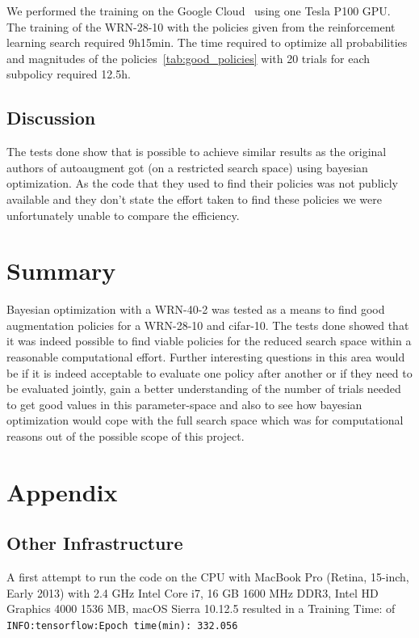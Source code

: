 \documentclass[10pt,twocolumn,letterpaper]{article}
\begin{document}
We performed the training on the Google Cloud~\cite{GCloud} using one Tesla P100 GPU. The training of the WRN-28-10 with the policies given from the reinforcement learning search required 9h15min. The time required to optimize all probabilities and magnitudes of the policies~\ref{tab:good_policies} with 20 trials for each subpolicy required 12.5h. \newline

\subsection{Discussion}

The tests done show that is possible to achieve similar results as the original authors of autoaugment got (on a restricted search space) using bayesian optimization. As the code that they used to find their policies was not publicly available and they don't state the effort taken to find these policies we were unfortunately unable to compare the efficiency. 

\section{Summary}

Bayesian optimization with a WRN-40-2 was tested as a means to find good augmentation policies for a WRN-28-10 and cifar-10. The tests done showed that it was indeed possible to find viable policies for the reduced search space within a reasonable computational effort. Further interesting questions in this area would be if it is indeed acceptable to evaluate one policy after another or if they need to be evaluated jointly, gain a better understanding of the number of trials needed to get good values in this parameter-space and also to see how bayesian optimization would cope with the full search space which was for computational reasons out of the possible scope of this project.


\section{Appendix}

\subsection{Other Infrastructure}
A first attempt to run the code on the CPU with MacBook Pro (Retina, 15-inch, Early 2013) with 2.4 GHz Intel Core i7, 16 GB 1600 MHz DDR3, Intel HD Graphics 4000 1536 MB, macOS Sierra 10.12.5 resulted in a Training Time: of \texttt{INFO:tensorflow:Epoch time(min): 332.056} \newline
\end{document}
